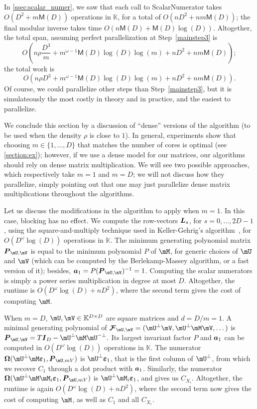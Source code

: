 \documentclass[12pt]{article}
\newcommand{\mat}[1]{\bm{\MakeUppercase{#1}}} %
\newcommand{\row}[1]{\bm{\MakeLowercase{#1}}} %
\newcommand{\col}[1]{\bm{\MakeLowercase{#1}}} %
\newcommand{\seq}{\mat{\mathcal{F}}} %
\newcommand{\minpoly}{P}
\newcommand{\density}{\rho}
\def\M {\ensuremath{\mathsf{M}}}
\def\K{\mathbb{K}}
\def\K {\ensuremath{\mathbb{K}}}
\begin{document}
In \cref{ssec:scalar_numer}, we saw that each call to ScalarNumerator
takes $O(D^2 + m\M(D))$ operations in $\K$, for a total of $O(nD^2 + n
m\M(D))$; the final modular inverse takes time $O(n\M(D) + \M(D) \log(D))$.
Altogether, the total span, assuming perfect parallelization 
at Step~\ref{mainstep3} is
$$O\left (n\density \frac{D^3}m + m^{\omega-1} \M(D) \log(D) \log(m) + nD^2 + nm\M(D)\right );$$
the total work is
$$O\left (n\density D^3 + m^{\omega-1} \M(D) \log(D) \log(m) + nD^2 +
nm\M(D)\right ).$$ Of course, we could parallelize other steps than
Step~\ref{mainstep3}, but it is simulateously the most costly in
theory and in practice, and the easiest to parallelize. 

\medskip

We conclude this section by a discussion of ``dense'' versions of the
algorithm (to be used when the density $\density$ is close to $1$). In
general, experiments show that choosing $m \in\{1,\dots, D\}$ that
matches the number of cores is optimal (see \cref{section:ex});
however, if we use a dense model for our matrices, our algorithms
should rely on dense matrix multiplication. We will see two possible
approaches, which respectively take $m=1$ and $m=D$; we will not
discuss how they parallelize, simply pointing out that one may just
parallelize dense matrix multiplications throughout the algorithms.

Let us discuss the modifications in the algorithm to apply when
$m=1$. In this case, blocking has no effect. We compute the
row-vectors $\mat{L}_s$, for $s=0,\dots,2D-1$, using the
square-and-multiply technique used in Keller-Gehrig's
algorithm~\cite{Keller85}, for $O(D^\omega \log(D))$ operations in
$\K$. The minimum generating polynomial matrix $\mat{P}_{\mU,\mV}$ is
equal to the minimum polynomial $\minpoly$ of $\mM$, for generic
choices of $\mU$ and $\mV$ (which can be computed by the
Berlekamp-Massey algorithm, or a fast version of it); besides,
$\row{a}_1 = P (\mat{P}_{\mU,\mV})^{-1} = 1$. Computing the scalar
numerators is simply a power series multiplication in degree at most
$D$. Altogether, the runtime is $O(D^{\omega} \log(D) + nD^2)$, 
where the second term gives the cost of computing $\mM$.


When $m = D$, $\mU,\mV \in \mathbb{K}^{D \times D}$ are square
matrices and $d = D/m = 1$. A minimal generating polynomial of
$\seq_{\mU,\mV} = (\mU^\perp\mV, \mU^\perp\mM\mV,\dots)$ is
$\mat{P}_{\mU,\mV} = T \mat{I}_D - \mU^\perp\mM\mU^{-\perp}.$ Its
largest invariant factor $\minpoly$ and $\row{a}_1$ can be computed in
$O(D^\omega \log(D))$ operations in $\K$.  The numerator
$\mat{\Omega}(\mU^\perp \mM \col{\varepsilon}_1, \mat{P}_{\mU,mV})$ is
$\mU^\perp \col{\varepsilon}_1$, that is the first column of
$\mU^\perp$, from which we recover $C_1$ through a dot product with
$\row{a}_1$. Similarly, the numerator $\mat{\Omega}(\mU^\perp \mM
\mM_i \col{\varepsilon}_1, \mat{P}_{\mU,mV})$ is $\mU^\perp \mM_i
\col{\varepsilon}_1$, and gives us $C_{X_i}$. Altogether, 
the runtime is again  $O(D^{\omega} \log(D) + nD^2)$, 
where the second term now gives the cost of computing $\mM$,
as well as $C_1$ and all $C_{X_i}$.
\end{document}
